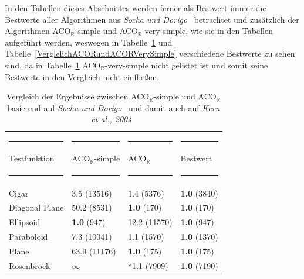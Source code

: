 \documentclass[fontsize=12, a4aper]{scrartcl}
\begin{document}
	In den Tabellen dieses Abschnittes werden ferner als Bestwert immer die Bestwerte aller Algorithmen aus \textit{Socha und Dorigo}~\cite{socha2008ant} betrachtet und zusätzlich der Algorithmen ACO\(_{\mathbb{R}}\)-simple und ACO\(_{\mathbb{R}}\)-very-simple, wie sie in den Tabellen aufgeführt werden, weswegen in Tabelle~\ref{VerglelichACORundACORSimple} und Tabelle~\ref{VerglelichACORundACORVerySimple} verschiedene Bestwerte zu sehen sind, da in Tabelle~\ref{VerglelichACORundACORSimple} ACO\(_{\mathbb{R}}\)-very-simple nicht gelistet ist und somit seine Bestwerte in den Vergleich nicht einfließen.
	
	\begin{table}[H]
		
		\fontsize{10pt}{12pt}
		
		\caption{Vergleich der Ergebnisse zwischen ACO\(_{\mathbb{R}}\)-simple und ACO\(_{\mathbb{R}}\) basierend auf \textit{Socha und Dorigo}~\cite{socha2008ant} und damit auch auf \textit{Kern et al., 2004}~\cite{kern2004learning}}
		
		\label{VerglelichACORundACORSimple}
		
		\begin{tabularx}{\textwidth}{l|l|l|l}
			
			\rule{3,45cm}{0.4pt} & \rule{3,45cm}{0.4pt} & \rule{3,45cm}{0.4pt} & \rule{3,45cm}{0.4pt}\\
			
			Testfunktion & ACO\(_{\mathbb{R}}\)-simple & ACO\(_{\mathbb{R}}\) & Bestwert\\
			
			\rule{3,45cm}{0.4pt} & \rule{3,45cm}{0.4pt} & \rule{3,45cm}{0.4pt} & \rule{3,45cm}{0.4pt}\\
			
			Cigar & 3.5 (13516) & 1.4 (5376) & \textbf{1.0} (3840)\\
			
			Diagonal Plane & 50.2 (8531) & \textbf{1.0} (170) & \textbf{1.0} (170)\\
			
			Ellipsoid & \textbf{1.0} (947) & 12.2 (11570) & \textbf{1.0} (947)\\
			
			Paraboloid & 7.3 (10041) & 1.1 (1570) & \textbf{1.0} (1370)\\
			
			Plane & 63.9 (11176) & \textbf{1.0} (175) & \textbf{1.0} (175)\\
			
			Rosenbrock & \(\infty\) & *1.1 (7909) & \textbf{1.0} (7190)\\
			

\end{tabularx}
\end{table}
\end{document}
